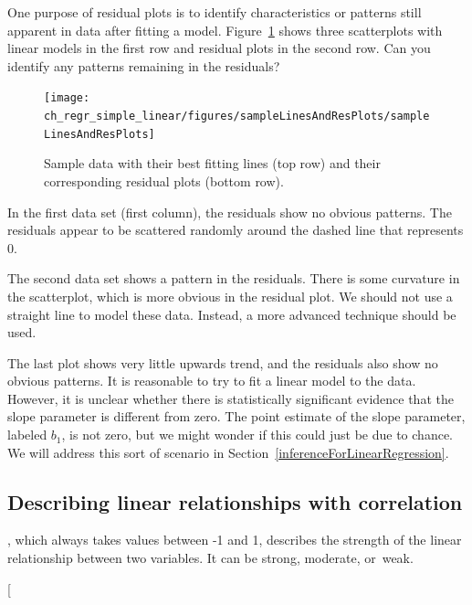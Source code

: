 \begin{example}{One purpose of residual plots is to identify characteristics or patterns still apparent in data after fitting a model. Figure~\ref{sampleLinesAndResPlots} shows three scatterplots with linear models in the first row and residual plots in the second row. Can you identify any patterns remaining in the residuals?}

\begin{figure}
   \centering
   \texttt{[image: ch\_regr\_simple\_linear/figures/sampleLinesAndResPlots/sampleLinesAndResPlots]}
   \caption{Sample data with their best fitting lines (top row) and their corresponding residual plots (bottom row).}
   \label{sampleLinesAndResPlots}
\end{figure}
In the first data set (first column), the residuals show no obvious patterns. The residuals appear to be scattered randomly around the dashed line that represents 0.

The second data set shows a pattern in the residuals. There is some curvature in the scatterplot, which is more obvious in the residual plot. We should not use a straight line to model these data. Instead, a more advanced technique should be used.

The last plot shows very little upwards trend, and the residuals also show no obvious patterns. It is reasonable to try to fit a linear model to the data. However, it is unclear whether there is statistically significant evidence that the slope parameter is different from zero. The point estimate of the slope parameter, labeled $b_1$, is not zero, but we might wonder if this could just be due to chance. We will address this sort of scenario in Section~\ref{inferenceForLinearRegression}.
\end{example}

\subsection{Describing linear relationships with correlation}


\begin{termBox}{
, which always takes values between -1 and 1, describes the strength of the linear relationship between two variables. It can be strong, moderate, or~weak.}
\end{termBox}\marginpar[\raggedright\vspace{-11.5mm}

